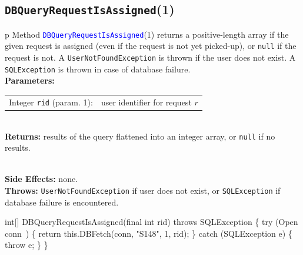 \subsection{{\tt{}\protect{}DBQueryRequestIsAssigned}(1)}
\begin{tabular}{p{\textwidth}}
\toprule
{}
Method \textcolor{blue}{{\tt{}\protect{}DBQueryRequestIsAssigned}}(1) returns a
positive-length array if the given request is assigned (even if the request is
not yet picked-up), or {\tt{}null} if the request is not.  A
{\tt{}UserNotFoundException} is thrown if the user does not exist.
A {\tt{}SQLException} is thrown in case of database failure.\\
\midrule
\textbf{Parameters:} \\
\begin{tabular}{lp{116mm}}
Integer {\tt{}rid} (param. 1):&user identifier for request $r$
\end{tabular}\\
\textbf{Returns:} results of the query flattened into an integer array, or
{\tt{}null} if no results.

\\
\textbf{Side Effects:} none.\\
\textbf{Throws:} {\tt{}UserNotFoundException} if user does not exist, or
{\tt{}SQLException} if database failure is encountered.\\
\bottomrule
\end{tabular}
\nwenddocs{}\endmoddef{}
int[] DBQueryRequestIsAssigned(final int rid) throws SQLException \{
  try (\LA{}Open \code{}conn\edoc{}~{\nwtagstyle{}}\RA{}) \{
    return this.DBFetch(conn, "S148", 1, rid);
  \} catch (SQLException e) \{
    throw e;
  \}
\}
\eatline
{}\nwendcode{}\nwdocspar
